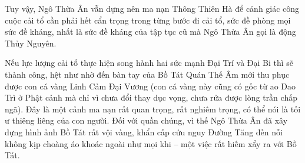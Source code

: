 Tuy vậy, Ngô Thừa Ân vẫn dựng nên ma nạn Thông Thiên Hà để cảnh giác công cuộc cải tổ cần phải hết cẩn trọng trong từng bước đi cải tổ, sức đề phòng mọi sức đề kháng, nhất là sức đề kháng của tập tục cũ mà Ngô Thừa Ân gọi là động Thủy Nguyên.

Nếu lực lượng cải tổ thực hiện song hành hai sức mạnh Đại Trí và Đại Bi thì sẽ thành công, hệt như nhờ đến bàn tay của Bồ Tát Quán Thế Âm mới thu phục được con cá vàng Linh Cảm Đại Vương (con cá vàng này cũng có gốc từ ao Dao Trì ở Phật cảnh mà chỉ vì chưa đổi thay dục vọng, chưa rửa được lòng trần chấp ngã). Đây là một cảnh ma nạn rất quan trọng, rất nghiêm trọng, có thể nói là tối ư thiêng liêng của con người. Đối với quần chúng, vì thế Ngô Thừa Ân đã xây dựng hình ảnh Bồ Tát rất vội vàng, khẩn cấp cứu nguy Đường Tăng đến nỗi không kịp choàng áo khoác ngoài như mọi khi -- một việc rất hiếm xẩy ra với Bồ Tát.
